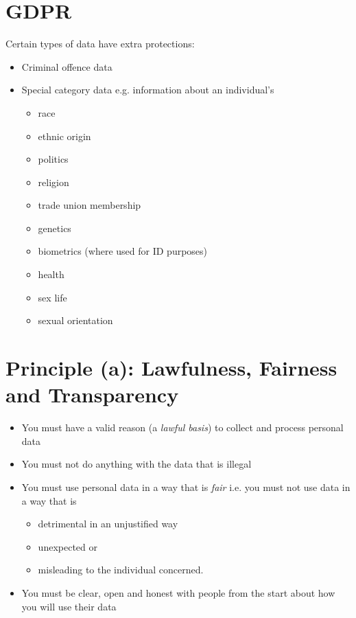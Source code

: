 \documentclass{article}
\begin{document}
\section{GDPR}
Certain types of data have extra protections:
\begin{itemize}
\item Criminal offence data
\item Special category data e.g. information about an individual's
\begin{itemize}
\item race
\item ethnic origin
\item politics
\item religion
\item trade union membership
\item genetics
\item biometrics (where used for ID purposes)
\item health
\item sex life
\item sexual orientation
\end{itemize}
\end{itemize}



\section{Principle (a): Lawfulness, Fairness and Transparency}
\begin{itemize}
\item You must have a valid reason (a {\em lawful basis}) to collect and process personal data
\item You must not do anything with the data that is illegal
\item You must use personal data in a way that is {\em fair} i.e. you must not use data in a way that is
\begin{itemize}
\item detrimental in an unjustified way
\item unexpected or
\item misleading to the individual concerned.
\end{itemize}
\item You must be clear, open and honest with people from the start about how you will use their data
\end{itemize}
\end{document}

